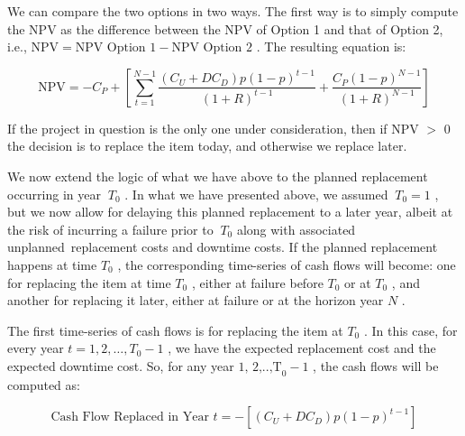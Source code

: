 We can compare the two options in two ways. The first way is to simply compute the  NPV as the difference between the NPV of Option 1 and that of Option 2, i.e.,  \( \mbox{NPV}=\mbox{NPV Option }1-\mbox{NPV Option }2 \) . The resulting equation is:\par




\begin{equation}\label{npv_7}
\mbox{NPV}= -C_{P}+ \left[  \sum _{t=1}^{N-1}\frac{ \left( C_{U}+DC_{D} \right) p \left( 1-p \right) ^{t-1}}{ \left( 1+R \right) ^{t-1}}+\frac{C_{P} \left( 1-p \right) ^{N-1}}{ \left( 1+R \right) ^{N-1}} \right]
\end{equation}


If the project in question is the only one under consideration, then if  \( \text{NPV} \)  $>$ 0 the decision is to replace the item today, and otherwise we replace later.

We now extend the logic of what we have above to the planned replacement occurring in year \( ~T_{0} \) . In what we have presented above, we assumed  \( ~T_{0}=1 \) , but we now allow for delaying this planned replacement to a later year, albeit at the risk of incurring a failure prior to  \( ~T_{0} \)  along with associated unplanned\ replacement costs and downtime costs.  If the planned replacement happens at time  \( T_{0} \) , the corresponding time-series of cash flows will become: one for replacing the item at time  \( T_{0} \) , either at failure before  \( T_{0} \)  or at  \( T_{0} \) , and another for replacing it later, either at failure or at the horizon year  \( N \) .\par

The first time-series of cash flows is for replacing the item at  \( T_{0} \) . In this case, for every year  \( t=1, 2, \ldots ,T_{0}-1 \) , we have the expected replacement cost and the expected downtime cost. So, for any year  \( \text{1, 2,..,T}_{0}-1 \) , the cash flows will be computed as:\par




\begin{equation}\label{npv_8}
\mbox{Cash Flow Replaced in Year }t= - \left[  \left( C_{U}+DC_{D} \right)  p \left( 1-p \right) ^{t-1} \right]
\end{equation}


